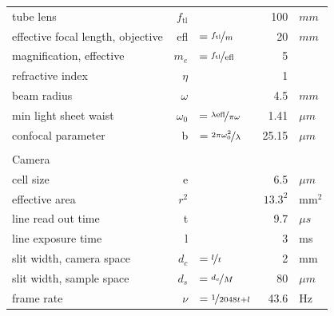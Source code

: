 \documentclass[12pt]{spieman}  %
\begin{document}
\begin{landscape}
\begin{table}[t!]
\begin{tabular}{lrlrl}
		tube lens 																	& $f_{\text{tl}}$	&																																					& 100			&	$mm$		\\
		effective focal length, objective						& efl							& $=\nicefrac{f_{\text{tl}}}{m}$																					& 20			& $mm$		\\
		magnification, effective										& $m_e$						&	$=\nicefrac{f_{\text{tl}}}{\text{efl}}$																	& 5				&					\\
		refractive index														&	$\eta$					&																																					& 1				& 				\\
		beam radius																	& $\omega$				&																																					& 4.5			& $mm$		\\
		min light sheet waist												& $\omega_0$			& $=\nicefrac{\lambda \text{efl}}{\pi \omega}$														& 1.41		& $\mu m$	\\
		confocal parameter													& b								& $=\nicefrac{2 \pi \omega_0^2}{\lambda}$																	& 25.15		& $\mu m$	\\\\
		\multicolumn{5}{l}{Camera}\\\hline\hline
		cell size																		& e								&																																					& 6.5			&	$\mu m$	\\
		effective area 															& $r^2$						&																																					& $13.3^2$	&	$\text{mm}^2$	\\
		line read out time													& t								&																																					& 9.7			&	$\mu s$	\\
		line exposure time													& l								&																																					& 3				&	ms			\\
		slit width, camera space										& $d_c$						& $=\nicefrac{l}{t} $																											& 2				&	mm	\\
		slit width, sample space										& $d_s$						&	$=\nicefrac{d_c}{M}$																										& 80			&	$\mu m$	\\
		frame rate																	& $\nu$						&	$=\nicefrac{1}{2048 t + l}$																							& 43.6		& Hz\\
		\end{tabular}
\end{table}
\end{landscape}		
		
\end{document}
